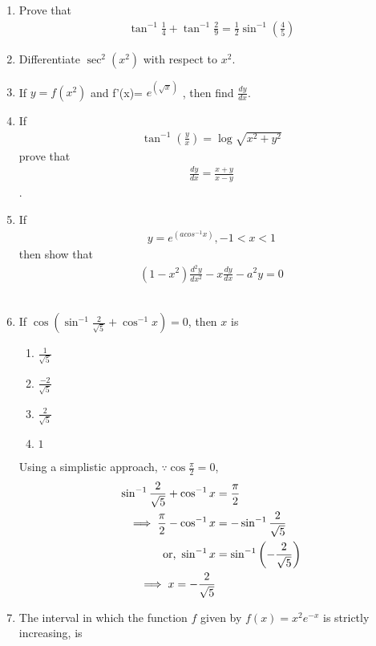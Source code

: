 \documentclass[journal,12pt,twocolumn]{IEEEtran}
\renewcommand\thesection{\arabic{section}}
\begin{document}
\begin{enumerate}[label=\thesection.\arabic*.,ref=\thesection.\theenumi]
		 

    
\item Prove that \begin{align} \tan^{-1} \frac{1}{4} + \tan^{-1} \frac{2}{9} = \frac{1}{2} \sin^{-1} (\frac{4}{5}) \nonumber \end{align}
 \item Differentiate $ \sec^2(x^2) $ with respect to $ x^2 $.
 \item If $y=f(x^2)$  and  f'(x)= $ e^{\left(\sqrt{x}\right)}$  , then find $\frac{dy}{dx}$.\\
\item If \begin{align} \tan^{-1}(\frac{y}{x})=\log \sqrt{x^2+y^2} \nonumber \end{align}  prove that \begin{align} \frac{dy}{dx}=\frac{x+y}{x-y} \nonumber \end{align}.

\item If  \begin{align} y=e^{(acos^{-1}x)}  , -1 < x < 1 \nonumber \end{align}  then show that  \begin{align} (1-x^2) \frac{d^2y}{dx^2} - x \frac{dy}{dx} - a^2y =0 \nonumber \end{align}\\

\item If $\cos (\sin^{-1} \frac{2}{\sqrt 5} + \cos^{-1} x) = 0$, then $x$ is  

\begin{enumerate}
   \item $\frac{1}{\sqrt5}$\\
   \item $ \frac{-2}{\sqrt5}$\\
    \item $ \frac{2}{\sqrt5}$\\
    \item $1$
\end{enumerate}
		\solution  Using a simplistic approach,  $\because \cos \frac{\pi}{2} = 0$,
		\begin{align}
			\sin^{-1} \frac{2}{\sqrt 5} + \cos^{-1} x &= \frac{\pi}{2}
			\\
			\implies \frac{\pi}{2} -\cos^{-1}x &= - \sin^{-1} \frac{2}{\sqrt 5} 
			\\
			\text{or, }\sin^{-1}x &=  \sin^{-1} \left(-\frac{2}{\sqrt 5}   \right)
			\\
			\implies x = -\frac{2}{\sqrt 5}   
		\end{align}
\item The interval in which the function $f$ given by $ f({x}) = x^2e^{-x} $ is strictly increasing,  is


\end{enumerate}
\end{document}
